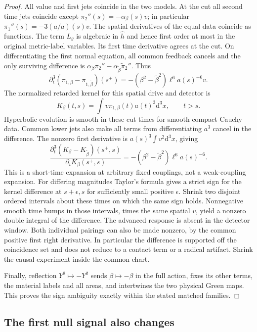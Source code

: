 \documentclass[11pt]{article}
\newcommand{\dd}{\mathrm d}
\begin{document}
\begin{proof}
All value and first jets coincide in the two models. At the cut all second time jets coincide except $\pi_2''(s)=-\alpha_\beta(s)v$; in particular $\pi_1''(s)=-3(\dot a/a)(s)v$. The spatial derivatives of the equal data coincide as functions. The term $L_g$ is algebraic in $\widehat h$ and hence first order at most in the original metric-label variables. Its first time derivative agrees at the cut. On differentiating the first normal equation, all common feedback cancels and the only surviving difference is $\alpha_\beta\pi_2''-\alpha_{\widetilde\beta}\widetilde\pi_2''$. Thus
\[
 \partial_t^3(\pi_{1,\beta}-\pi_{1,\widetilde\beta})(s^+)
       =-(\beta^2-\widetilde\beta^2)\ell^6 a(s)^{-6}v.
\]
The normalized retarded kernel for this spatial drive and detector is
\[ K_\beta(t,s)=\int v\pi_{1,\beta}(t) a(t)^3\dd^3x,\qquad t>s. \]
 Hyperbolic evolution is smooth in these cut times for smooth compact Cauchy data. Common lower jets also make all terms from differentiating $a^3$ cancel in the difference. The nonzero first derivative is $a(s)^3\int v^2\dd^3x$, giving
\begin{equation}\label{eq:ratio}
 \frac{\partial_t^3(K_\beta-K_{\widetilde\beta})(s^+,s)}{\partial_t K_\beta(s^+,s)}
       =-(\beta^2-\widetilde\beta^2)\ell^6 a(s)^{-6} .
\end{equation}
This is a short-time expansion at arbitrary fixed couplings, not a weak-coupling expansion. For differing magnitudes Taylor's formula gives a strict sign for the kernel difference at $s+\epsilon,s$ for sufficiently small positive $\epsilon$. Shrink two disjoint ordered intervals about these times on which the same sign holds. Nonnegative smooth time bumps in those intervals, times the same spatial $v$, yield a nonzero double integral of the difference. The advanced response is absent in the detector window. Both individual pairings can also be made nonzero, by the common positive first right derivative. In particular the difference is supported off the coincidence set and does not reduce to a contact term or a radical artifact. Shrink the causal experiment inside the common chart.

Finally, reflection $Y^2\mapsto-Y^2$ sends $\beta\mapsto-\beta$ in the full action, fixes its other terms, the material labels and all areas, and intertwines the two physical Green maps. This proves the sign ambiguity exactly within the stated matched families.
\end{proof}

\subsection{The first null signal also changes}
\end{document}
